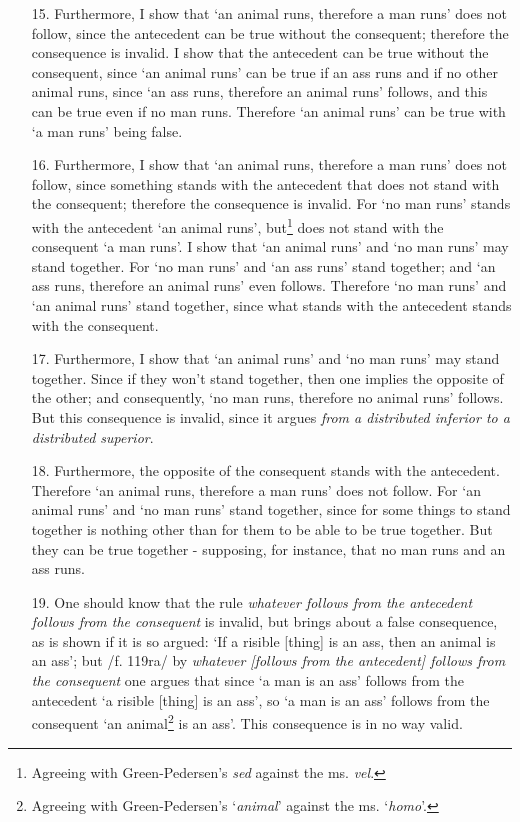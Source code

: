 \documentclass[]{article}
\begin{document}
\begin{enumerate}
\item[15.] Furthermore, I show that `an animal runs, therefore a man runs' does not follow, since the antecedent can be true without the consequent; therefore the consequence is invalid. I show that the antecedent can be true without the consequent, since `an animal runs' can be true if an ass runs and if no other animal runs, since `an ass runs, therefore an animal runs' follows, and this can be true even if no man runs. Therefore `an animal runs' can be true with `a man runs' being false.
\item[16.] Furthermore, I show that `an animal runs, therefore a man runs' does not follow, since something stands with the antecedent that does not stand with the consequent; therefore the consequence is invalid. For `no man runs' stands with the antecedent `an animal runs', but\footnote{Agreeing with Green-Pedersen's \textit{sed} against the ms. \textit{vel}.} does not stand with the consequent `a man runs'. I show that `an animal runs' and `no man runs' may stand together. For `no man runs' and `an ass runs' stand together; and `an ass runs, therefore an animal runs' even follows. Therefore `no man runs' and `an animal runs' stand together, since what stands with the antecedent stands with the consequent.
\item[17.] Furthermore, I show that `an animal runs' and `no man runs' may stand together. Since if they won't stand together, then one implies the opposite of the other; and consequently, `no man runs, therefore no animal runs' follows. But this consequence is invalid, since it argues \textit{from a distributed inferior to a distributed superior}.
\item[18.] Furthermore, the opposite of the consequent stands with the antecedent. Therefore `an animal runs, therefore a man runs' does not follow. For `an animal runs' and `no man runs' stand together, since for some things to stand together is nothing other than for them to be able to be true together. But they can be true together - supposing, for instance, that no man runs and an ass runs.
\item[19.] One should know that the rule \textit{whatever follows from the antecedent follows from the consequent} is invalid, but brings about a false consequence, as is shown if it is so argued: `If a risible [thing] is an ass, then an animal is an ass'; but /f. 119ra/ by \textit{whatever [follows from the antecedent] follows from the consequent} one argues that since `a man is an ass' follows from the antecedent `a risible [thing] is an ass', so `a man is an ass' follows from the consequent `an animal\footnote{Agreeing with Green-Pedersen's `\textit{animal}' against the ms. `\textit{homo}'.} is an ass'. This consequence is in no way valid.

\end{enumerate}
\end{document}
